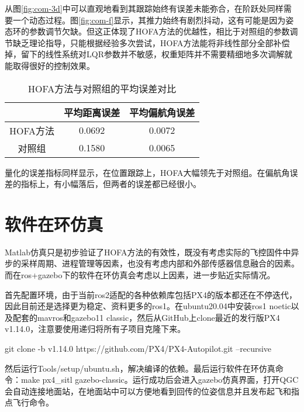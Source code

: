      从图\ref{fig:com-3d}中可以直观地看到其跟踪始终有误差未能弥合，在阶跃处同样需要一个动态过程。图\ref{fig:com-f}显示，其推力始终有剧烈抖动，这有可能是因为姿态环的参数调节欠缺。但这正体现了HOFA方法的优越性，相比于对照组的参数调节缺乏理论指导，只能根据经验多次尝试，HOFA方法能将非线性部分全部补偿掉，留下的线性系统对LQR参数并不敏感，权重矩阵并不需要精细地多次调解就能取得很好的控制效果。
     \begin{table}
      \centering
      \begin{tabular}{ccc}
          \toprule
          & 平均距离误差 & 平均偏航角误差 \\
          \midrule
          HOFA方法 & 0.0692 & 0.0072 \\
          对照组 & 0.1580 & 0.0065 \\
          \bottomrule
      \end{tabular}
      \caption{HOFA方法与对照组的平均误差对比}
  \end{table}

  量化的误差指标同样显示，在位置跟踪上，HOFA大幅领先于对照组。在偏航角误差的指标上，有小幅落后，但两者的误差都已经很小。

\section{软件在环仿真}
Matlab仿真只是初步验证了HOFA方法的有效性，既没有考虑实际的飞控固件中异步的采样周期、进程管理等因素，也没有考虑内部和外部传感器信息融合的因素。而在ros+gazebo下的软件在环仿真会考虑以上因素，进一步贴近实际情况。

首先配置环境，由于当前ros2适配的各种依赖库包括PX4的版本都还在不停迭代，因此目前还是选择更为稳定、资料更多的ros1。在ubuntu20.04中安装ros1 noetic以及配套的mavros和gazebo11 classic，然后从GitHub上clone最近的发行版PX4 v1.14.0，注意要使用递归将所有子项目克隆下来。

git clone -b v1.14.0 https://github.com/PX4/PX4-Autopilot.git --recursive

然后运行Tools/setup/ubuntu.sh，解决编译的依赖。最后运行软件在环仿真命令：make px4_sitl gazebo-classic。运行成功后会进入gazebo仿真界面，打开QGC会自动连接地面站，在地面站中可以方便地看到回传的位姿信息并且发布起飞和指点飞行命令。